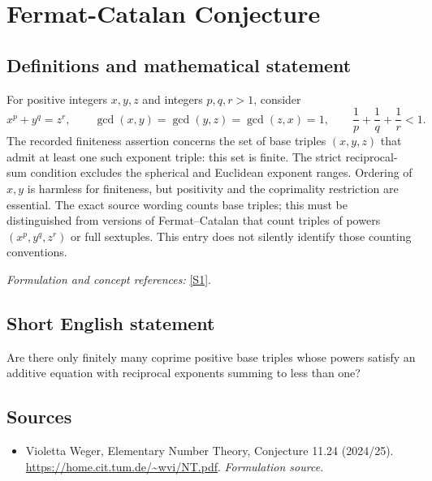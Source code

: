 \documentclass[11pt]{article}
\begin{document}
\section*{\texorpdfstring{Fermat-Catalan Conjecture}{Fermat-Catalan Conjecture}}\label{1289}
\subsection{Definitions and mathematical statement}
For positive integers $x,y,z$ and integers $p,q,r>1$, consider
\[
 x^p+y^q=z^r,\qquad
 \gcd(x,y)=\gcd(y,z)=\gcd(z,x)=1,
 \qquad\frac1p+\frac1q+\frac1r<1.
\]
The recorded finiteness assertion concerns the set of base triples $(x,y,z)$ that admit at least one such exponent triple: this set is finite. The strict reciprocal-sum condition excludes the spherical and Euclidean exponent ranges. Ordering of $x,y$ is harmless for finiteness, but positivity and the coprimality restriction are essential. The exact source wording counts base triples; this must be distinguished from versions of Fermat--Catalan that count triples of powers $(x^p,y^q,z^r)$ or full sextuples. This entry does not silently identify those counting conventions.
\par\smallskip\textit{Formulation and concept references:} \href{https://home.cit.tum.de/~wvi/NT.pdf}{[S1]}.

\subsection{Short English statement}
Are there only finitely many coprime positive base triples whose powers satisfy an additive equation with reciprocal exponents summing to less than one?
\subsection{Sources}
\begin{itemize}
\item[S1]Violetta Weger, Elementary Number Theory, Conjecture 11.24 (2024/25).
\url{https://home.cit.tum.de/~wvi/NT.pdf}.
\textit{Formulation source.}
\end{itemize}
\end{document}
